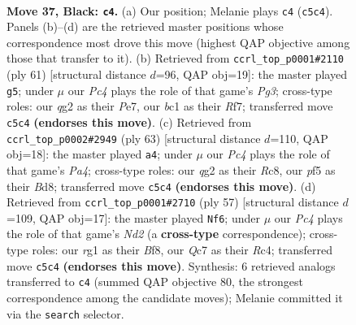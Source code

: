 \documentclass[11pt]{article}
\begin{document}
\clearpage

\begin{figure}[p]\centering
\begin{subfigure}{0.46\textwidth}\centering
\resizebox{\linewidth}{!}{%
\newchessgame
\chessboard[
  setfen={2b3k1/p1qn1r1p/1r3b2/2p2P2/Pp1p4/1P4N1/R3P1Q1/1NBK2R1 b - - 6 37},
  showmover=false,
  pgfstyle=straightmove, color=movearrow, markmove={c5-c4}
]}
\caption{}
\end{subfigure}\hfill
\begin{subfigure}{0.46\textwidth}\centering
\resizebox{\linewidth}{!}{%
\newchessgame
\chessboard[
  setfen={5rk1/4prb1/p1pq2p1/3pn2p/P7/1P2N2P/1BPQRPP1/1R4K1 b - - 1 31},
  showmover=false,
  pgfstyle=straightmove, color=movearrow, markmove={g6-g5}
]}
\caption{}
\end{subfigure}
\\[4pt]
\begin{subfigure}{0.46\textwidth}\centering
\resizebox{\linewidth}{!}{%
\newchessgame
\chessboard[
  setfen={r1rb2k1/6np/2q1ppp1/p1Pp4/3P2P1/1R3NBP/Q4P2/1R4K1 b - - 1 32},
  showmover=false,
  pgfstyle=straightmove, color=movearrow, markmove={a5-a4}
]}
\caption{}
\end{subfigure}\hfill
\begin{subfigure}{0.46\textwidth}\centering
\resizebox{\linewidth}{!}{%
\newchessgame
\chessboard[
  setfen={2r1qbk1/p2n1pp1/4p2p/8/2rPP3/P3R1BP/5PP1/QR2N1K1 b - - 8 29},
  showmover=false,
  pgfstyle=straightmove, color=movearrow, markmove={d7-f6}
]}
\caption{}
\end{subfigure}
\caption{\textbf{Move 37, Black: \texttt{c4}.} (a) Our position; Melanie plays \texttt{c4} (\texttt{c5c4}). Panels (b)--(d) are the retrieved master positions whose correspondence most drove this move (highest QAP objective among those that transfer to it). (b) Retrieved from \texttt{ccrl\_top\_p0001\#2110} (ply 61) [structural distance $d$=96, QAP obj=19]: the master played \texttt{g5}; under $\mu$ our \emph{Pc4} plays the role of that game's \emph{Pg3}; cross-type roles: our \emph{q}g2 as their \emph{P}e7, our \emph{b}c1 as their \emph{R}f7; transferred move \texttt{c5c4} \textbf{(endorses this move)}. (c) Retrieved from \texttt{ccrl\_top\_p0002\#2949} (ply 63) [structural distance $d$=110, QAP obj=18]: the master played \texttt{a4}; under $\mu$ our \emph{Pc4} plays the role of that game's \emph{Pa4}; cross-type roles: our \emph{q}g2 as their \emph{R}c8, our \emph{p}f5 as their \emph{B}d8; transferred move \texttt{c5c4} \textbf{(endorses this move)}. (d) Retrieved from \texttt{ccrl\_top\_p0001\#2710} (ply 57) [structural distance $d$=109, QAP obj=17]: the master played \texttt{Nf6}; under $\mu$ our \emph{Pc4} plays the role of that game's \emph{Nd2} (a \textbf{cross-type} correspondence); cross-type roles: our \emph{r}g1 as their \emph{B}f8, our \emph{Q}c7 as their \emph{R}c4; transferred move \texttt{c5c4} \textbf{(endorses this move)}. Synthesis: 6 retrieved analogs transferred to \texttt{c4} (summed QAP objective 80, the strongest correspondence among the candidate moves); Melanie committed it via the \texttt{search} selector.}
\label{fig:thought-m73}
\end{figure}
\end{document}
